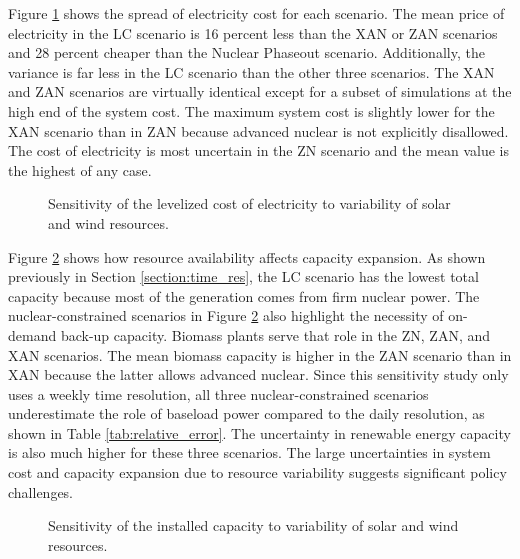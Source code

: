 Figure \ref{fig:obj_cost_plot} shows the spread of electricity cost for each scenario.
The mean price of electricity in the \gls{LC} scenario is 16 percent less than
the \gls{XAN} or \gls{ZAN} scenarios and 28 percent cheaper than the Nuclear Phaseout scenario.
Additionally, the variance is far less in the \gls{LC} scenario than the other
three scenarios. The \gls{XAN} and \gls{ZAN} scenarios are virtually identical
except for a subset of simulations at the high end of the system cost. The maximum
system cost is slightly lower for the \gls{XAN} scenario than in \gls{ZAN} because advanced
nuclear is not explicitly disallowed. The cost of electricity is most uncertain
in the \gls{ZN} scenario and the mean value is the highest of any case.

\begin{figure}[H]
  \centering
  \resizebox{0.95\columnwidth}{!}{}
  \caption{Sensitivity of the levelized cost of electricity to variability of
   solar and wind resources.}
  \label{fig:obj_cost_plot}
\end{figure}

Figure \ref{fig:il_capacity} shows how resource availability affects capacity
expansion. As shown previously in Section \ref{section:time_res}, the \gls{LC} scenario
has the lowest total capacity because most of the generation comes from firm nuclear
power. The nuclear-constrained scenarios in Figure \ref{fig:il_capacity} also
highlight the necessity of on-demand back-up capacity. Biomass plants serve that role
in the \gls{ZN}, \gls{ZAN}, and \gls{XAN} scenarios. The mean biomass capacity is higher
in the \gls{ZAN} scenario than in \gls{XAN} because the latter allows advanced nuclear. Since
this sensitivity study only uses a weekly time resolution, all three nuclear-constrained
scenarios underestimate the role of baseload power compared to the daily resolution,
as shown in Table \ref{tab:relative_error}. The uncertainty in renewable energy
capacity is also much higher for these three scenarios.
The large uncertainties in system cost and capacity expansion due to resource
variability suggests significant policy challenges.


\begin{figure}[H]
  \centering
  \resizebox{0.95\columnwidth}{!}{}
  \caption{Sensitivity of the installed capacity to variability of
   solar and wind resources.}
  \label{fig:il_capacity}
\end{figure}

